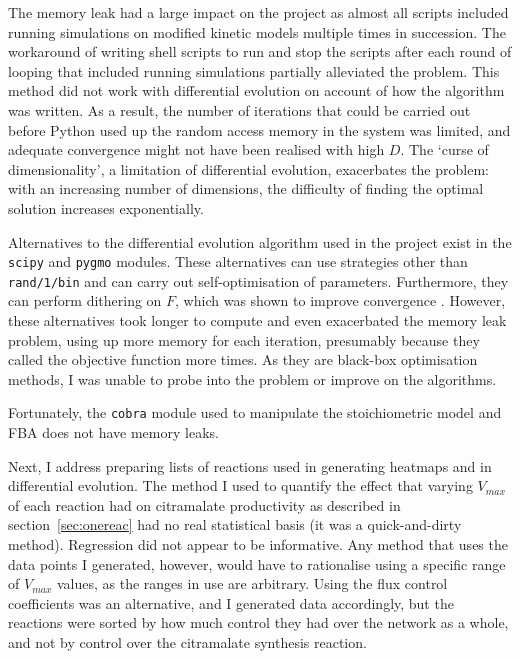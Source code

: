 \documentclass[parskip=full, numbers=noenddot]{scrreprt}
\begin{document}
The memory leak had a large impact on the project as almost all scripts included running simulations on modified kinetic models multiple times in succession. The workaround of writing shell scripts to run and stop the scripts after each round of looping that included running simulations partially alleviated the problem. This method did not work with differential evolution on account of how the algorithm was written. As a result, the number of iterations that could be carried out before Python used up the random access memory in the system was limited, and adequate convergence might not have been realised with high $D$. The `curse of dimensionality', a limitation of differential evolution, exacerbates the problem: with an increasing number of dimensions, the difficulty of finding the optimal solution increases exponentially.

Alternatives to the differential evolution algorithm used in the project exist in the \texttt{scipy} and \texttt{pygmo} modules. These alternatives can use strategies other than \texttt{rand/1/bin} and can carry out self-optimisation of parameters. Furthermore, they can perform dithering on $F$, which was shown to improve convergence \citep{storn_usage_1996}. However, these alternatives took longer to compute and even exacerbated the memory leak problem, using up more memory for each iteration, presumably because they called the objective function more times. As they are black-box optimisation methods, I was unable to probe into the problem or improve on the algorithms.

Fortunately, the \texttt{cobra} module used to manipulate the stoichiometric model and FBA does not have memory leaks.

Next, I address preparing lists of reactions used in generating heatmaps and in differential evolution. The method I used to quantify the effect that varying $V_{max}$ of each reaction had on citramalate productivity as described in section~\ref{sec:onereac} had no real statistical basis (it was a quick-and-dirty method). Regression did not appear to be informative. Any method that uses the data points I generated, however, would have to rationalise using a specific range of $V_{max}$ values, as the ranges in use are arbitrary. Using the flux control coefficients was an alternative, and I generated data accordingly, but the reactions were sorted by how much control they had over the network as a whole, and not by control over the citramalate synthesis reaction.
\end{document}
